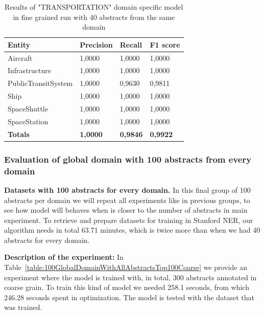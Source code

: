 \documentclass[thesis=M,english]{FITthesis}[2018/05/30]
\begin{document}
	\begin{table}[H]\centering
		\begin{tabular}{|l|l|l|l|}
			\hline {\textbf{Entity}} & {\textbf{Precision}} & {\textbf{Recall}} & {\textbf{F1 score}}\\\hline
				Aircraft & 1,0000 & 1,0000 & 1,0000\\
				Infrastructure & 1,0000 & 1,0000 & 1,0000\\
				PublicTransitSystem & 1,0000 & 0,9630 & 0,9811\\
				Ship & 1,0000 & 1,0000 & 1,0000\\				
				SpaceShuttle & 1,0000 & 1,0000 & 1,0000\\
				SpaceStation & 1,0000 & 1,0000 & 1,0000\\\hline
				\textbf{Totals} & \textbf{1,0000} & \textbf{0,9846} & \textbf{0,9922}\\\hline
		\end{tabular}
		\caption{Results of "TRANSPORTATION" domain specific model in fine grained run with 40 abstracts from the same domain \label{table:TransportationDomainWithTransportationTop40Fine}}
	\end{table}	



\subsubsection{Evaluation of global domain with 100 abstracts from every domain }

\textbf{Datasets with 100 abstracts for every domain.} In this final group of 100 abstracts per domain we will repeat all experiments like in previous groups, to see how model will behaves when is closer to the number of abstracts in main experiment. To retrieve and prepare datasets for training in Stanford NER, our algorithm needs in total 63.71 minutes, which is twice more than when we had 40 abstracts for every domain.  

	\textbf{Description of the experiment:} In Table~\ref{table:100GlobalDomainWithAllAbstractsTop100Coarse} we provide an experiment where the model is trained with, in total, 300 abstracts annotated in coarse grain. To train this kind of model we needed  258.1 seconds, from which 246.28 seconds spent in optimization. The model is tested with the dataset that was trained. 
\end{document}
